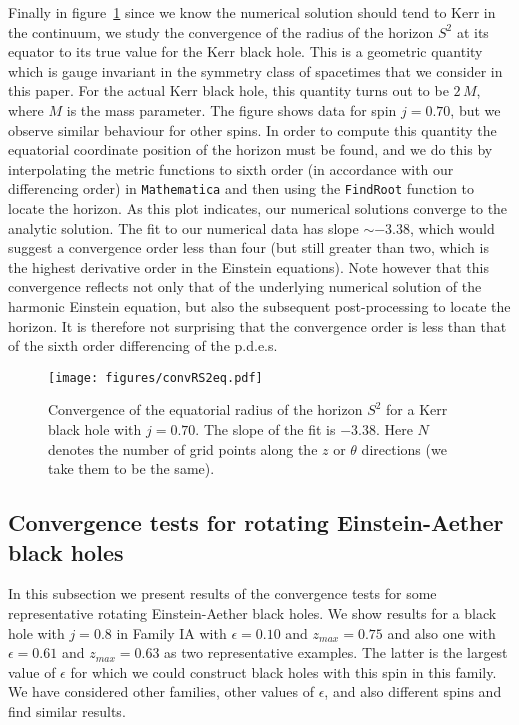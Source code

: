 \documentclass[12pt]{article}
\numberwithin{equation}{section}
\begin{document}
Finally in figure~\ref{fig:horizon_kerr} since we know the numerical solution should tend to Kerr in the continuum, we study the convergence of the radius of the horizon $S^2$ at its equator to its true value for the Kerr black hole.  This is a geometric quantity which is gauge invariant in the symmetry class of spacetimes that we consider in this paper. For the actual Kerr black hole, this quantity turns out to be $2\,M$, where $M$ is the mass parameter. The figure shows data for spin $j=0.70$, but we observe similar behaviour for other spins. In order to compute this quantity the equatorial coordinate position of the horizon must be found, and we do this by interpolating the metric functions to sixth order (in accordance with our differencing order) in {\tt Mathematica} and then using the {\tt FindRoot} function to locate the horizon. As this plot indicates, our numerical solutions converge to the analytic solution. The fit to our numerical data has slope $\sim -3.38$, which would suggest a convergence order less than four (but still greater than two, which is the highest derivative order in the Einstein equations). Note however that this convergence reflects not only that of the underlying numerical solution of the harmonic Einstein equation, but also the subsequent post-processing to locate the horizon. It is therefore not surprising that the convergence order is less than that of the sixth order differencing of the p.d.e.s.

\begin{figure}[t]
\centering
\texttt{[image: figures/convRS2eq.pdf]}
\caption{Convergence of the equatorial radius of the horizon $S^2$ for a Kerr black hole with $j=0.70$. The slope of the fit is $-3.38$. Here $N$ denotes the number of grid points along the $z$ or $\theta$ directions (we take them to be the same).}
\label{fig:horizon_kerr}
\end{figure}




\subsection{Convergence tests for rotating Einstein-Aether black holes}
In this subsection we present results of the convergence tests for some representative rotating Einstein-Aether black holes.  We show results for a black hole with $j=0.8$ in Family IA with $\epsilon=0.10$ and $z_{max} = 0.75$ and also one with $\epsilon=0.61$ and $z_{max} = 0.63$ as two representative examples. The latter is the largest value of $\epsilon$ for which we could construct black holes with this spin in this family. We have considered other families, other values of $\epsilon$, and also different spins and find similar results. 
\end{document}
